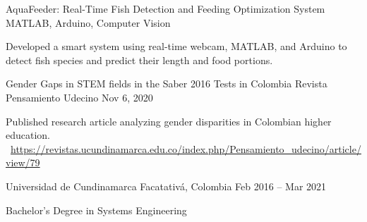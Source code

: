 \documentclass[]{awesome-cv}
\begin{document}
\begin{cventries}
	\vspace{2mm}
	\cventry
	{}
	{AquaFeeder: Real-Time Fish Detection and Feeding Optimization System \vspace{-5mm}}
	{MATLAB, Arduino, Computer Vision \vspace{-5mm}}
	{}
	{\begin{cvsectionnormaltext}
		\item{Developed a smart system using real-time webcam, MATLAB, and Arduino to detect fish species and predict their length and food portions. }
	\end{cvsectionnormaltext}}	
	
	\vspace{-3mm}
	\cventry
	{}
	{Gender Gaps in STEM fields in the Saber 2016 Tests in Colombia \vspace{-5mm}}
	{Revista Pensamiento Udecino \vspace{-5mm}}
	{Nov 6, 2020 \vspace{-5mm}}
	{\begin{cvsectionnormaltext}
		\item{Published research article analyzing gender disparities in Colombian higher education. 
		\newline \faLink\ \href{https://revistas.ucundinamarca.edu.co/index.php/Pensamiento_udecino/article/view/79}{https://revistas.ucundinamarca.edu.co/index.php/Pensamiento\_udecino/article/view/79}}
	\end{cvsectionnormaltext}}
	
	\vspace{-5mm}
	
\end{cventries}

\vspace{8mm}
\begin{cventries}
	\vspace{-3mm}
	\cventry
	{}
	{Universidad de Cundinamarca \vspace{-5mm}}
	{Facatativá, Colombia \vspace{-5mm}}
	{Feb 2016 – Mar 2021 \vspace{-5mm}}
	{\begin{cvsectionnormaltext} 
		\item{Bachelor's Degree in Systems Engineering}
	\end{cvsectionnormaltext}}
\end{cventries}
\end{document}
